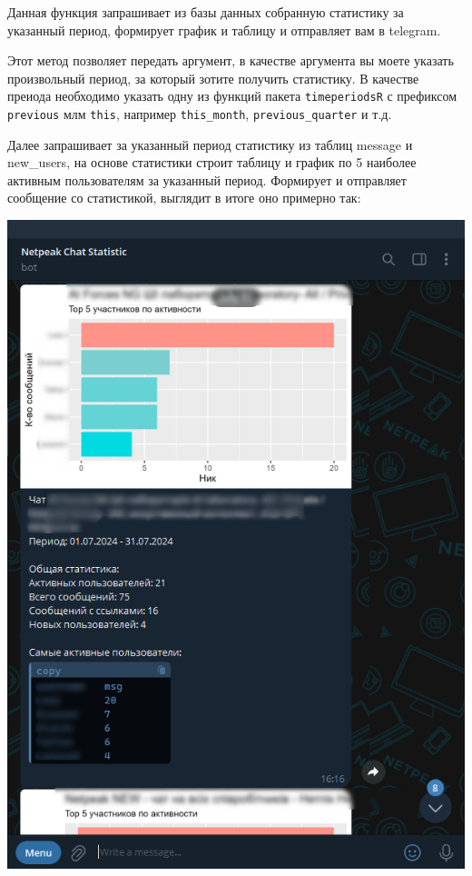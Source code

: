 \documentclass[
]{book}
\begin{document}
Данная функция запрашивает из базы данных собранную статистику за указанный период, формирует график и таблицу и отправляет вам в telegram.

Этот метод позволяет передать аргумент, в качестве аргумента вы моете указать произвольный период, за который зотите получить статистику. В качестве преиода необходимо указать одну из функций пакета \texttt{timeperiodsR} с префиксом \texttt{previous} млм \texttt{this}, например \texttt{this\_month}, \texttt{previous\_quarter} и т.д.

Далее запрашивает за указанный период статистику из таблиц message и new\_users, на основе статистики строит таблицу и график по 5 наиболее активным пользователям за указанный период. Формирует и отправляет сообщение со статистикой, выглядит в итоге оно примерно так:

\includegraphics{img/2-chatstat.png}
\end{document}
